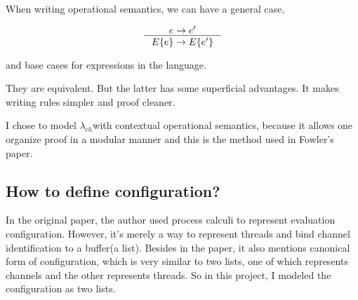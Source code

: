 \documentclass{article}
\newcommand{\lambdach}{$\lambda_{ch}$}
\begin{document}


When writing operational semantics, we can have a general case,

\begin{gather*}
    \inference{
        e -> e'
    }{
        E\{e\} -> E\{e'\}
    }
\end{gather*}

and base cases for expressions in the language.


They are equivalent. But the latter has some superficial advantages. It makes writing rules simpler
and proof cleaner\cite{harper2016practical}.

I chose to model \lambdach with contextual operational semantics, because it allows one organize proof
in a modular manner and this is the method used in Fowler's paper\cite{fowler2019typed}.

\subsection{How to define configuration?}

In the original paper\cite{fowler2019typed}, the author used process calculi to represent evaluation configuration.
However, it's merely a way to represent threads and bind channel identification to a buffer(a list). Besides in the
paper\cite{fowler2019typed}, it also mentions canonical form of configuration, which is very similar to two lists, one of which
represents channels and the other represents threads. So in this project, I modeled the configuration as two lists.
\end{document}
